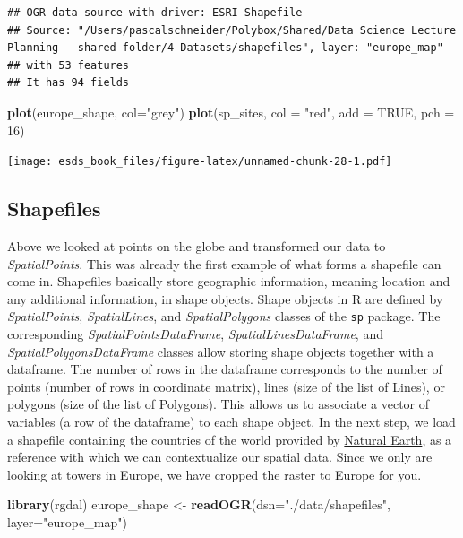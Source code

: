 \documentclass[
]{book}
\newenvironment{Shaded}{\begin{snugshade}}{\end{snugshade}}
\newcommand{\DataTypeTok}[1]{\textcolor[rgb]{0.13,0.29,0.53}{#1}}
\newcommand{\DecValTok}[1]{\textcolor[rgb]{0.00,0.00,0.81}{#1}}
\newcommand{\KeywordTok}[1]{\textcolor[rgb]{0.13,0.29,0.53}{\textbf{#1}}}
\newcommand{\NormalTok}[1]{#1}
\newcommand{\OtherTok}[1]{\textcolor[rgb]{0.56,0.35,0.01}{#1}}
\newcommand{\StringTok}[1]{\textcolor[rgb]{0.31,0.60,0.02}{#1}}
\begin{document}
\begin{verbatim}
## OGR data source with driver: ESRI Shapefile 
## Source: "/Users/pascalschneider/Polybox/Shared/Data Science Lecture Planning - shared folder/4 Datasets/shapefiles", layer: "europe_map"
## with 53 features
## It has 94 fields
\end{verbatim}

\begin{Shaded}
\begin{Highlighting}[]
\KeywordTok{plot}\NormalTok{(europe_shape, }\DataTypeTok{col=}\StringTok{"grey"}\NormalTok{)}
\KeywordTok{plot}\NormalTok{(sp_sites, }\DataTypeTok{col =} \StringTok{"red"}\NormalTok{, }\DataTypeTok{add =} \OtherTok{TRUE}\NormalTok{, }\DataTypeTok{pch =} \DecValTok{16}\NormalTok{)}
\end{Highlighting}
\end{Shaded}

\texttt{[image: esds\_book\_files/figure-latex/unnamed-chunk-28-1.pdf]}

\hypertarget{shapefiles}{%
\subsection{Shapefiles}\label{shapefiles}}

Above we looked at points on the globe and transformed our data to \emph{SpatialPoints}. This was already the first example of what forms a shapefile can come in. Shapefiles basically store geographic information, meaning location and any additional information, in shape objects. Shape objects in R are defined by \emph{SpatialPoints}, \emph{SpatialLines}, and \emph{SpatialPolygons} classes of the \texttt{sp} package. The corresponding \emph{SpatialPointsDataFrame}, \emph{SpatialLinesDataFrame}, and \emph{SpatialPolygonsDataFrame} classes allow storing shape objects together with a dataframe. The number of rows in the dataframe corresponds to the number of points (number of rows in coordinate matrix), lines (size of the list of Lines), or polygons (size of the list of Polygons). This allows us to associate a vector of variables (a row of the dataframe) to each shape object.
In the next step, we load a shapefile containing the countries of the world provided by \href{www.naturalearthdata.com}{Natural Earth}, as a reference with which we can contextualize our spatial data. Since we only are looking at towers in Europe, we have cropped the raster to Europe for you.

\begin{Shaded}
\begin{Highlighting}[]
\KeywordTok{library}\NormalTok{(rgdal)}
\NormalTok{europe_shape <-}\StringTok{ }\KeywordTok{readOGR}\NormalTok{(}\DataTypeTok{dsn=}\StringTok{"./data/shapefiles"}\NormalTok{, }\DataTypeTok{layer=}\StringTok{"europe_map"}\NormalTok{)}
\end{Highlighting}
\end{Shaded}
\end{document}
